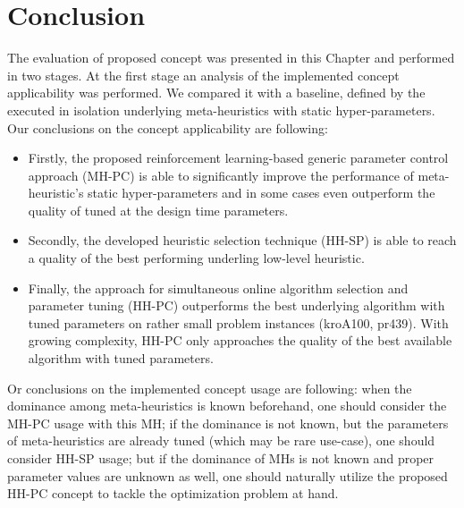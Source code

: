 \section{Conclusion}\label{eval: conclution}
The evaluation of proposed concept was presented in this Chapter and performed in two stages. At the first stage an analysis of the implemented concept applicability was performed. We compared it with a baseline, defined by the executed in isolation underlying meta-heuristics with static hyper-parameters. Our conclusions on the concept applicability are following:
\begin{itemize}
	\item Firstly, the proposed reinforcement learning-based generic parameter control approach (MH-PC) is able to significantly improve the performance of meta-heuristic's static hyper-parameters and in some cases even outperform the quality of tuned at the design time parameters.
	
	\item Secondly, the developed heuristic selection technique (HH-SP) is able to reach a quality of the best performing underling low-level heuristic. 
	
	\item Finally, the approach for simultaneous online algorithm selection and parameter tuning (HH-PC) outperforms the best underlying algorithm with tuned parameters on rather small problem instances (kroA100, pr439). With growing complexity, HH-PC only approaches the quality of the best available algorithm with tuned parameters.
\end{itemize}

Or conclusions on the implemented concept usage are following: when the dominance among meta-heuristics is known beforehand, one should consider the MH-PC usage with this MH; if the dominance is not known, but the parameters of meta-heuristics are already tuned (which may be rare use-case), one should consider HH-SP usage; but if the dominance of MHs is not known and proper parameter values are unknown as well, one should naturally utilize the proposed HH-PC concept to tackle the optimization problem at hand.


